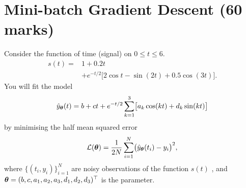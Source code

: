 \documentclass[10pt]{article}
\begin{document}
\newpage
\section{Mini-batch Gradient Descent (60 marks)}

Consider the function of time (signal) on $0\le t\le 6$.
\[
\begin{aligned}
s(t)={}&1+0.2t\\
 &+e^{-t/2}\bigl[2\cos t-\sin(2t)+0.5\cos(3t)\bigr].
\end{aligned}
\]
You will fit the model
\[
\hat y_{\bm{\theta}}(t)=b+ct+e^{-t/2}\sum_{k=1}^{3}
       \bigl[a_k\cos(kt)+d_k\sin(kt)\bigr]
\]
by minimising the half mean squared error
\[
\mathcal{L}(\bm{\theta})=\frac{1}{2N}\sum_{i=1}^N
           \bigl(\hat y_{\bm{\theta}}(t_i)-y_i\bigr)^2,
\]
where $\{(t_i,y_i)\}_{i=1}^N$ are noisy observations of the function $s(t)$ , and  $\bm{\theta}=(b,c,a_1,a_2,a_3,d_1,d_2,d_3)^\top$ is the parameter.
\end{document}
